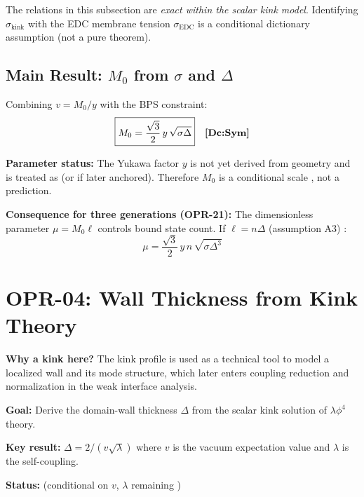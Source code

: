 \begin{tcolorbox}[colback=yellow!5!white, colframe=yellow!50!black,
    title=\textbf{Dictionary Note (Scope)}]
The relations in this subsection are \emph{exact within the scalar kink model}.
Identifying $\sigma_{\text{kink}}$ with the EDC membrane tension $\sigma_{\text{EDC}}$
is a conditional dictionary assumption \tagDc{} (not a pure theorem).
\end{tcolorbox}

\subsection{Main Result: $M_0$ from $\sigma$ and $\Delta$}

Combining $v = M_0/y$ with the BPS constraint:
\begin{equation}
    \boxed{M_0 = \frac{\sqrt{3}}{2} \, y \, \sqrt{\sigma \Delta}}
    \quad \textbf{[Dc:Sym]}{}
    \label{eq:opr01_result}
\end{equation}

\textbf{Parameter status:} The Yukawa factor $y$ is not yet derived from geometry
and is treated as \tagOpen{} (or \tagCal{} if later anchored). Therefore $M_0$ is a
conditional scale \tagDc{}, not a prediction.

\textbf{Consequence for three generations (OPR-21):}
The dimensionless parameter $\mu = M_0 \ell$ controls bound state count. If $\ell = n\Delta$
(assumption A3) \tagP{}:
\begin{equation}
    \mu = \frac{\sqrt{3}}{2} \, y \, n \, \sqrt{\sigma \Delta^3}
    \label{eq:opr01_mu}
\end{equation}

\section{OPR-04: Wall Thickness from Kink Theory}
\label{sec:opr04}

\noindent\textbf{Why a kink here?}
The kink profile is used as a technical tool to model a localized wall and its
mode structure, which later enters coupling reduction and normalization in the
weak interface analysis.

\begin{tcolorbox}[edcGuardrail, title=\textbf{Epistemic Status: OPR-04}]
\textbf{Goal:} Derive the domain-wall thickness $\Delta$ from the scalar kink
solution of $\lambda\phi^4$ theory.

\textbf{Key result:} $\Delta = 2/(v\sqrt{\lambda})$ where $v$ is the vacuum
expectation value and $\lambda$ is the self-coupling.

\textbf{Status:} \tagDc{} (conditional on $v$, $\lambda$ remaining \tagP{})
\end{tcolorbox}

